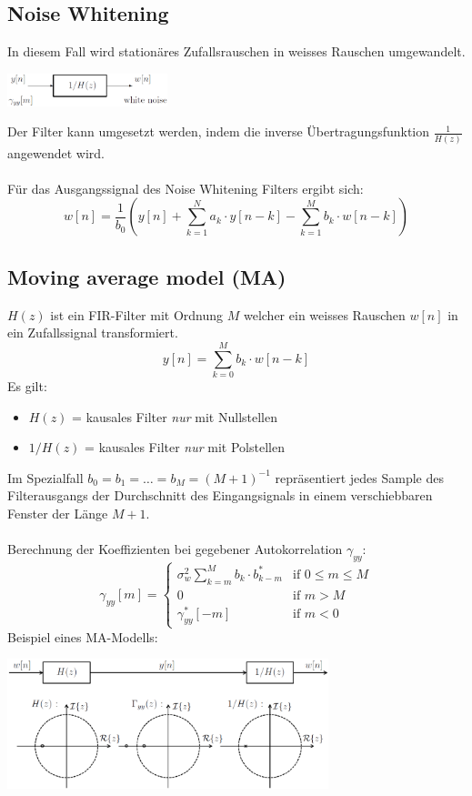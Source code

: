\subsection{Noise Whitening}
In diesem Fall wird stationäres Zufallsrauschen in weisses Rauschen umgewandelt. 
\begin{center}
	\includegraphics[width=0.35\textwidth]{../fig/noise_whitening}
\end{center}
Der Filter kann umgesetzt werden, indem die inverse Übertragungsfunktion $\frac{1}{H(z)}$ 
angewendet wird.\\\\
Für das Ausgangssignal des Noise Whitening Filters ergibt sich:
\[ w[n] = \frac{1}{b_0}\left( y[n] + \sum_{k=1}^{N}a_k\cdot y[n-k] - 
	\sum_{k=1}^{M}b_k\cdot w[n-k] \right) \]
	
\subsection{Moving average model (MA)}
$H(z)$ ist ein FIR-Filter mit Ordnung $M$ welcher ein weisses Rauschen $w[n]$
in ein Zufallssignal transformiert.
\[ y[n] = \sum_{k=0}^{M}b_k\cdot w[n-k] \]
Es gilt:
\begin{itemize}[noitemsep,topsep=3pt]
	\item $H(z)$ = kausales Filter \emph{nur} mit Nullstellen
	\item $1/H(z)$ = kausales Filter \emph{nur} mit Polstellen
\end{itemize}
Im Spezialfall $b_0=b_1=\ldots=b_M=(M+1)^{-1}$ repräsentiert jedes Sample des
Filterausgangs der Durchschnitt des Eingangsignals in einem verschiebbaren
Fenster der Länge $M+1$.\\
\\
Berechnung der Koeffizienten bei gegebener Autokorrelation $\gamma_{yy}$:
\[ \gamma_{yy}[m] = \left\lbrace \begin{matrix}
	\sigma_w^2\sum_{k=m}^{M}b_k\cdot b_{k-m}^* & \textrm{if } 0\leq m \leq M\\
	0	& \textrm{if } m > M\\
	\gamma_{yy}^*[-m]	& \textrm{if } m < 0
\end{matrix}\right. \]
Beispiel eines MA-Modells:
\begin{center}
	\includegraphics[width=0.7\textwidth]{../fig/beispiel_ma_modell}
\end{center}
\newpage

